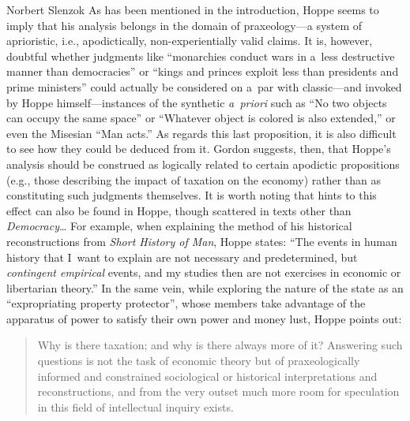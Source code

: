 \begin{artengenv}{Norbert Slenzok}
As has been mentioned in the introduction, Hoppe seems to imply that his analysis belongs in the domain of praxeology---a system of aprioristic, i.e., apodictically, non-experientially valid claims. It is, however, doubtful whether judgments like ``monarchies conduct wars in a~less destructive manner than democracies'' or ``kings and princes exploit less than presidents and prime ministers'' could actually be considered on a~par with classic---and invoked by Hoppe 
\parencite*[][p.xvi]{hoppe_democracy_2007} %
 himself---instances of the synthetic \textit{a~priori} such as ``No two objects can occupy the same space'' or ``Whatever object is colored is also extended,'' or even the Misesian ``Man acts.'' As regards this last proposition, it is also difficult to see how they could be deduced from it. Gordon 
\parencite*[][p.99]{gordon_austro-libertarian_2017} %
 suggests, then, that Hoppe's analysis should be construed as logically related to certain apodictic propositions (e.g., those describing the impact of taxation on the economy) rather than as constituting such judgments themselves. It is worth noting that hints to this effect can also be found in Hoppe, though scattered in texts other than \textit{Democracy}… For example, when explaining the method of his historical reconstructions from \textit{Short History of Man}, Hoppe 
\parencite*[][p.16]{hoppe_short_2015} %
 states: ``The events in human history that I~want to explain are not necessary and predetermined, but \textit{contingent empirical} events, and my studies then are not exercises in economic or libertarian theory.'' In the same vein, while exploring the nature of the state as an ``expropriating property protector'', whose members take advantage of the apparatus of power to satisfy their own power and money lust, Hoppe 
\parencite*[][p.33]{hoppe_economics_2006} %
 points out:



\begin{quote}
Why is there taxation; and why is there always more of it? Answering such questions is not the task of economic theory but of praxeologically informed and constrained sociological or historical interpretations and reconstructions, and from the very outset much more room for speculation in this field of intellectual inquiry exists.
\end{quote}




\end{artengenv}
